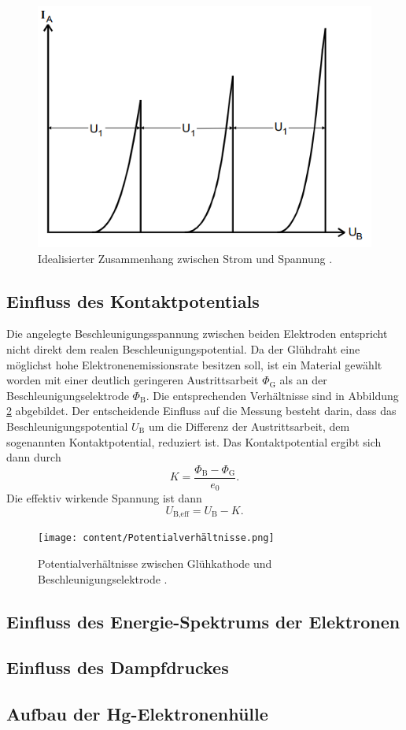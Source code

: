 \begin{figure}[H]
    \centering
    \includegraphics[scale=1]{content/Diskret.png}
    \caption{Idealisierter Zusammenhang zwischen Strom und Spannung \cite{sample}.}
    \label{fig:Diskret}
\end{figure}

\subsection{Einfluss des Kontaktpotentials}
Die angelegte Beschleunigungsspannung zwischen beiden Elektroden entspricht nicht direkt 
dem realen Beschleunigungspotential. Da der Glühdraht eine möglichst hohe Elektronenemissionsrate besitzen soll, ist 
ein Material gewählt worden mit einer deutlich geringeren Austrittsarbeit $\Phi_\text{G}$ als an der Beschleunigungselektrode $\Phi_\text{B}$.
Die entsprechenden Verhältnisse sind in Abbildung \ref{fig:KontaktU} abgebildet. Der entscheidende 
Einfluss auf die Messung besteht darin, dass das Beschleunigungspotential $U_\text{B}$ um
die Differenz der Austrittsarbeit, dem sogenannten Kontaktpotential, reduziert ist.
Das Kontaktpotential ergibt sich dann durch 
\begin{equation}
    K=\frac{\Phi_\text{B}-\Phi_\text{G}}{e_0}.
    \label{eq:Kontakt}
\end{equation}
Die effektiv wirkende Spannung ist dann
\begin{equation}
    U_\text{B,eff}=U_\text{B}-K.
\end{equation}
\begin{figure}[H]
    \centering
    \texttt{[image: content/Potentialverhältnisse.png]}
    \caption{Potentialverhältnisse zwischen Glühkathode und Beschleunigungselektrode \cite{sample}.}
    \label{fig:KontaktU}
\end{figure}
\subsection{Einfluss des Energie-Spektrums der Elektronen}
\subsection{Einfluss des Dampfdruckes}
\subsection{Aufbau der Hg-Elektronenhülle}
\cite{sample}

